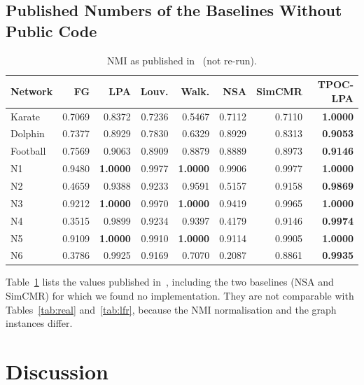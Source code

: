 \documentclass[conference]{IEEEtran}
\begin{document}
\subsection{Published Numbers of the Baselines Without Public Code}
\begin{table}[!htbp]
\centering
\caption{NMI as published in~\cite{kong2026} (not re-run).}
\label{tab:paper}
\scriptsize\setlength{\tabcolsep}{2.4pt}
\begin{tabular*}{\columnwidth}{@{\extracolsep{\fill}}lrrrrrrr}
\toprule
Network & FG & LPA & Louv. & Walk. & NSA & SimCMR & TPOC-LPA \\
\midrule
Karate & 0.7069 & 0.8372 & 0.7236 & 0.5467 & 0.7112 & 0.7110 & \textbf{1.0000} \\
Dolphin & 0.7377 & 0.8929 & 0.7830 & 0.6329 & 0.8929 & 0.8313 & \textbf{0.9053} \\
Football & 0.7569 & 0.9063 & 0.8909 & 0.8879 & 0.8889 & 0.8973 & \textbf{0.9146} \\
N1 & 0.9480 & \textbf{1.0000} & 0.9977 & \textbf{1.0000} & 0.9906 & 0.9977 & \textbf{1.0000} \\
N2 & 0.4659 & 0.9388 & 0.9233 & 0.9591 & 0.5157 & 0.9158 & \textbf{0.9869} \\
N3 & 0.9212 & \textbf{1.0000} & 0.9970 & \textbf{1.0000} & 0.9419 & 0.9965 & \textbf{1.0000} \\
N4 & 0.3515 & 0.9899 & 0.9234 & 0.9397 & 0.4179 & 0.9146 & \textbf{0.9974} \\
N5 & 0.9109 & \textbf{1.0000} & 0.9910 & \textbf{1.0000} & 0.9114 & 0.9905 & \textbf{1.0000} \\
N6 & 0.3786 & 0.9925 & 0.9169 & 0.7070 & 0.2087 & 0.8861 & \textbf{0.9935} \\
\bottomrule
\end{tabular*}
\end{table}
Table~\ref{tab:paper} lists the values published in~\cite{kong2026}, including the two baselines (NSA and SimCMR) for which we found no implementation. They are not comparable with Tables~\ref{tab:real} and~\ref{tab:lfr}, because the NMI normalisation and the graph instances differ.

\section{Discussion}\label{sec:discussion}
\end{document}
